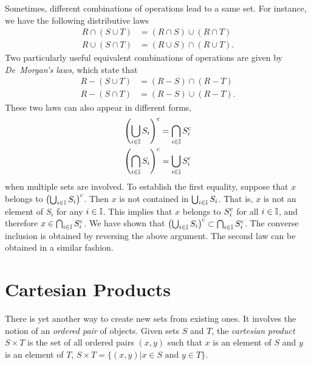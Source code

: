 Sometimes, different combinations of operations lead to a same set.
For instance, we have the following distributive laws
\begin{align*}
R \cap (S \cup T) &= (R \cap S) \cup (R \cap T) \\
R \cup (S \cap T) &= (R \cup S) \cap (R \cup T).
\end{align*}
Two particularly useful equivalent combinations of operations are given by \emph{De~Morgan's laws}, which state that
\begin{align*}
R - (S \cup T) &= (R - S) \cap (R - T) \\
R - (S \cap T) &= (R - S) \cup (R - T).
\end{align*}
These two laws can also appear in different forms,
\begin{align*}
\left( \bigcup_{i \in \mathbb{I}} S_{i} \right)^{\mathrm{c}}
&= \bigcap_{i \in \mathbb{I}} S_{i}^{\mathrm{c}} \\
\left( \bigcap_{i \in \mathbb{I}} S_{i} \right)^{\mathrm{c}}
&= \bigcup_{i \in \mathbb{I}} S_{i}^{\mathrm{c}}
\end{align*}
when multiple sets are involved.
To establish the first equality, suppose that $x$ belongs to $\left( \bigcup_{i \in \mathbb{I}} S_{i} \right)^{\mathrm{c}}$.
Then $x$ is not contained in $\bigcup_{i \in \mathbb{I}} S_{i}$.
That is, $x$ is not an element of $S_{i}$ for any $i \in \mathbb{I}$.
This implies that $x$ belongs to $S_{i}^{\mathrm{c}}$ for all $i \in \mathbb{I}$, and therefore $x \in \bigcap_{i \in \mathbb{I}} S_{i}^{\mathrm{c}}$.
We have shown that $\left( \bigcup_{i \in \mathbb{I}} S_{i} \right)^{\mathrm{c}} \subset \bigcap_{i \in \mathbb{I}} S_{i}^{\mathrm{c}}$.
The converse inclusion is obtained by reversing the above argument.
The second law can be obtained in a similar fashion.


\section{Cartesian Products}

There is yet another way to create new sets from existing ones.
It involves the notion of an \emph{ordered pair} of objects.
Given sets $S$ and $T$, the \emph{cartesian product} $S \times T$ is the set of all ordered pairs $(x, y)$ such that $x$ is an element of $S$ and $y$ is an element of $T$, $S \times T = \{ (x, y) | x \in S \text{ and } y \in T \}$.

